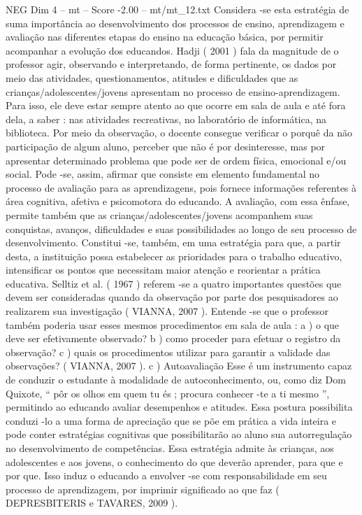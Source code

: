 \begin{textsample}{NEG Dim 4 – mt – Score -2.00 – mt/mt\_12.txt}
Considera -se esta estratégia de suma importância ao desenvolvimento dos processos de ensino, aprendizagem e avaliação nas diferentes etapas do ensino na educação básica, por permitir acompanhar a evolução dos educandos.
Hadji ( 2001 ) fala da magnitude de o professor agir, observando e interpretando, de forma pertinente, os dados por meio das atividades, questionamentos, atitudes e dificuldades que as crianças/adolescentes/jovens apresentam no processo de ensino-aprendizagem.
Para isso, ele deve estar sempre atento ao que ocorre em sala de aula e até fora dela, a saber : nas atividades recreativas, no laboratório de informática, na biblioteca.
Por meio da observação, o docente consegue verificar o porquê da não participação de algum aluno, perceber que não é por desinteresse, mas por apresentar determinado problema que pode ser de ordem física, emocional e/ou social.
Pode -se, assim, afirmar que consiste em elemento fundamental no processo de avaliação para as aprendizagens, pois fornece informações referentes à área cognitiva, afetiva e psicomotora do educando.
A avaliação, com essa ênfase, permite também que as crianças/adolescentes/jovens acompanhem suas conquistas, avanços, dificuldades e suas possibilidades ao longo de seu processo de desenvolvimento.
Constitui -se, também, em uma estratégia para que, a partir desta, a instituição possa estabelecer as prioridades para o trabalho educativo, intensificar os pontos que necessitam maior atenção e reorientar a prática educativa.
Selltiz et al. ( 1967 ) referem -se a quatro importantes questões que devem ser consideradas quando da observação por parte dos pesquisadores ao realizarem sua investigação ( VIANNA, 2007 ).
Entende -se que o professor também poderia usar esses mesmos procedimentos em sala de aula : a ) o que deve ser efetivamente observado? b ) como proceder para efetuar o registro da observação? c ) quais os procedimentos utilizar para garantir a validade das observações? ( VIANNA, 2007 ). c ) Autoavaliação Esse é um instrumento capaz de conduzir o estudante à modalidade de autoconhecimento, ou, como diz Dom Quixote, “ pôr os olhos em quem tu és ; procura conhecer -te a ti mesmo ”, permitindo ao educando avaliar desempenhos e atitudes.
Essa postura possibilita conduzi -lo a uma forma de apreciação que se põe em prática a vida inteira e pode conter estratégias cognitivas que possibilitarão ao aluno sua autorregulação no desenvolvimento de competências.
Essa estratégia admite às crianças, aos adolescentes e aos jovens, o conhecimento do que deverão aprender, para que e por que.
Isso induz o educando a envolver -se com responsabilidade em seu processo de aprendizagem, por imprimir significado ao que faz ( DEPRESBITERIS e TAVARES, 2009 ).

\end{textsample}
